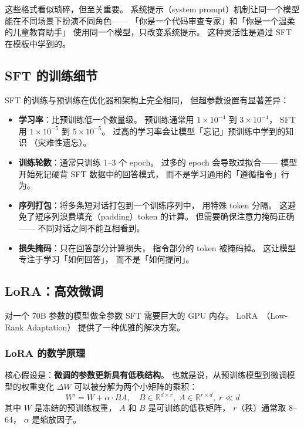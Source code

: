 这些格式看似琐碎，但至关重要。
系统提示（system prompt）机制让同一个模型
能在不同场景下扮演不同角色——
「你是一个代码审查专家」和「你是一个温柔的儿童教育助手」
使用同一个模型，只改变系统提示。
这种灵活性是通过 SFT 在模板中学到的。

\subsection{SFT 的训练细节}

SFT 的训练与预训练在优化器和架构上完全相同，
但超参数设置有显著差异：
\begin{itemize}[noitemsep]
  \item \textbf{学习率}：比预训练低一个数量级。
        预训练通常用 $1 \times 10^{-4}$ 到 $3 \times 10^{-4}$，
        SFT 用 $1 \times 10^{-5}$ 到 $5 \times 10^{-5}$。
        过高的学习率会让模型「忘记」预训练中学到的知识
       （灾难性遗忘）。
  \item \textbf{训练轮数}：通常只训练 1--3 个 epoch。
        过多的 epoch 会导致过拟合——
        模型开始死记硬背 SFT 数据中的回答模式，
        而不是学习通用的「遵循指令」行为。
  \item \textbf{序列打包}：将多条短对话打包到一个训练序列中，
        用特殊 token 分隔。
        这避免了短序列浪费填充（padding）token 的计算。
        但需要确保注意力掩码正确——
        不同对话之间不能互相看到。
  \item \textbf{损失掩码}：只在回答部分计算损失，
        指令部分的 token 被掩码掉。
        这让模型专注于学习「如何回答」，
        而不是「如何提问」。
\end{itemize}

\subsection{LoRA：高效微调}

对一个 70B 参数的模型做全参数 SFT 需要巨大的 GPU 内存。
LoRA~\cite{hu2021lora}（Low-Rank Adaptation）
提供了一种优雅的解决方案。

\subsubsection{LoRA 的数学原理}

核心假设是：\textbf{微调的参数更新具有低秩结构}。
也就是说，从预训练模型到微调模型的权重变化 $\Delta W$
可以被分解为两个小矩阵的乘积：
\begin{equation}
  W' = W + \alpha \cdot B A, \quad
  B \in \mathbb{R}^{d \times r}, \;
  A \in \mathbb{R}^{r \times d}, \;
  r \ll d
  \label{eq:lora}
\end{equation}
其中 $W$ 是冻结的预训练权重，
$A$ 和 $B$ 是可训练的低秩矩阵，
$r$（秩）通常取 8--64，
$\alpha$ 是缩放因子。

